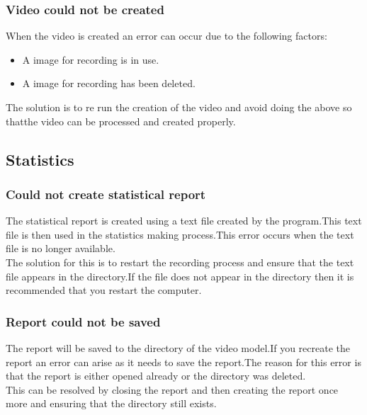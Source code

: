 \subsubsection{Video could not be created}
When the video is created an error can occur due to the following factors:
\begin{itemize}
\item A image for recording is in use.
\item A image for recording has been deleted.
\end{itemize}

The solution is to re run the creation of the video and avoid doing the above so thatthe video can be processed and created properly.
\subsection{Statistics}
\subsubsection{Could not create statistical report} 
The statistical report is created using a text file created by the program.This text file is then used in the statistics making process.This error occurs when the text file is no longer available.\\

The solution for this is to restart the recording process and ensure that the text file appears in the directory.If the file does not appear in the directory then it is recommended that you restart the computer.

\subsubsection{Report could not be saved}
The report will be saved to the directory of the video model.If you recreate the report an error can arise as it needs to save the report.The reason for this error is that the report is either opened already or the directory was deleted.\\

This can be resolved by closing the report and then creating the report once more and ensuring that the directory still exists.